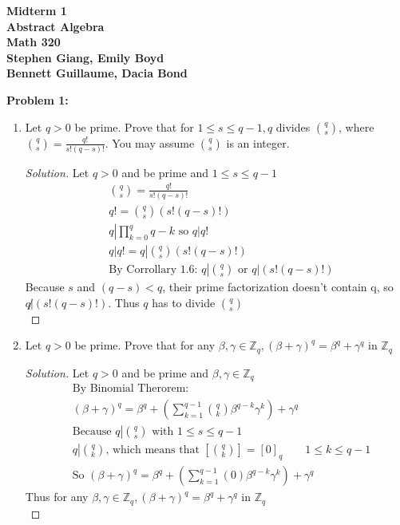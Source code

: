 \documentclass[12pt]{article}
\begin{document}
	
	\begin{center}
		\textbf{Midterm 1} \\
		\textbf{Abstract Algebra} \\
		\textbf{Math 320} \\
		\textbf{Stephen Giang, Emily Boyd} \\
		\textbf{Bennett Guillaume, Dacia Bond}
	\end{center}

\noindent \textbf{Problem 1: }
	\begin{enumerate}[label = (\alph*)]
		\item Let $q > 0$ be prime.  Prove that for $1 \leq s \leq q - 1, q$ divides $\binom{q}{s}$, where $\binom{q}{s} = \frac{q!}{s!(q-s)!}$. You may assume $\binom{q}{s}$ is an integer. 
		\begin{proof}[Solution]
			Let $q > 0$ and  be prime and $1 \leq s \leq q - 1$
			\begin{align*}
				&\binom{q}{s} = \frac{q!}{s!(q-s)!} \\
				&q! = \binom{q}{s}(s!(q-s)!) \\
				&q\left |\prod_{k = 0}^{q} q-k \right. \text{ so } q|q! \\
				&q|q! = q\left|\binom{q}{s}(s!(q-s)!)\right. \\
				&\text{By Corrollary 1.6: } q\left|\binom{q}{s}\right. \text{ or } q|(s!(q-s)!) 
			\end{align*}
			Because $s$ and $(q-s) < q$, their prime factorization doesn't contain q, so $q \not | (s!(q-s)!)$. Thus $q$ has to divide $\binom{q}{s}$ \\
		\end{proof} 
		\item Let $q > 0$ be prime. Prove that for any $\beta, \gamma \in \mathbb{Z}_q, (\beta + \gamma)^q = \beta^q + \gamma^q \text{ in } \mathbb{Z}_q$
		\begin{proof}[Solution]
			Let $q > 0$ and  be prime and $\beta, \gamma \in \mathbb{Z}_q$
			\begin{align*}
				&\text{By Binomial Therorem: } \\
				&(\beta + \gamma)^q = \beta^q + \left (\sum_{k = 1}^{q-1} \binom{q}{k} \beta^{q - k} \gamma^{k} \right )+ \gamma^q \\
				&\text{Because } q\left|\binom{q}{s}\right. \text{ with } 1 \leq s \leq q - 1 \\
				&q\left|\binom{q}{k}\right. \text{, which means that } \left [ \binom{q}{k} \right] = [0]_q \qquad 1 \leq k \leq q-1 \\
				&\text{So } (\beta + \gamma)^q = \beta^q + \left ( \sum_{k = 1}^{q-1} (0) \beta^{q - k} \gamma^{k} \right ) + \gamma^q 
			\end{align*}
			Thus for any $\beta, \gamma \in \mathbb{Z}_q, (\beta + \gamma)^q = \beta^q + \gamma^q \text{ in } \mathbb{Z}_q$  \\
		\end{proof} 
	\end{enumerate}
\end{document}
